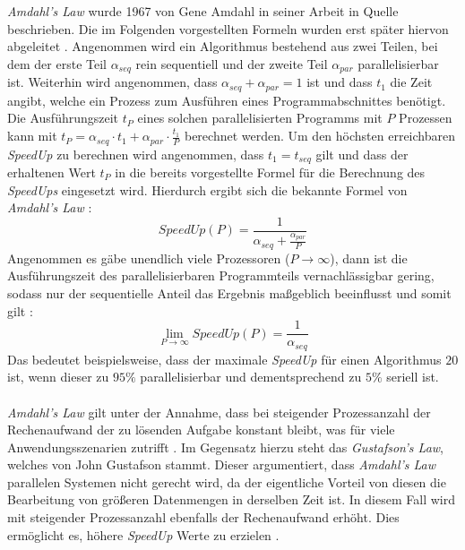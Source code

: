 \\\\
\emph{Amdahl's Law} wurde 1967 von Gene Amdahl in seiner Arbeit in Quelle \cite{amdahll1967validity} beschrieben. Die im Folgenden vorgestellten Formeln wurden erst später hiervon abgeleitet \cite{amdahll1967validity}. Angenommen wird ein Algorithmus bestehend aus zwei Teilen, bei dem der erste Teil $\alpha_{seq}$ rein sequentiell und der zweite Teil $\alpha_{par}$ parallelisierbar ist. Weiterhin wird angenommen, dass $\alpha_{seq}+\alpha_{par}=1$ ist und dass $t_1$ die Zeit angibt, welche ein Prozess zum Ausführen eines Programmabschnittes benötigt. Die Ausführungszeit $t_P$ eines solchen parallelisierten Programms mit $P$ Prozessen kann mit $t_P=\alpha_{seq} \cdot t_1 + \alpha_{par} \cdot \frac{t_1}{P}$ berechnet werden. Um den höchsten erreichbaren \emph{SpeedUp} zu berechnen wird angenommen, dass $t_1=t_{seq}$ gilt und dass der erhaltenen Wert $t_P$ in die bereits vorgestellte Formel für die Berechnung des \emph{SpeedUps} eingesetzt wird. Hierdurch ergibt sich die bekannte Formel von \emph{Amdahl's Law} \cite{nielsen2016introduction}: 
$$SpeedUp(P)=\frac{1}{\alpha_{seq}+\frac{\alpha_{par}}{P}}$$
Angenommen es gäbe unendlich viele Prozessoren ($P \rightarrow \infty$), dann ist die Ausführungszeit des parallelisierbaren Programmteils vernachlässigbar gering, sodass nur der sequentielle Anteil das Ergebnis maßgeblich beeinflusst und somit gilt \cite{nielsen2016introduction}:
$$\lim _{P \rightarrow \infty} SpeedUp(P)=\frac{1}{\alpha_{seq}}$$
Das bedeutet beispielsweise, dass der maximale \emph{SpeedUp} für einen Algorithmus $20$ ist, wenn dieser zu $95\%$ parallelisierbar und dementsprechend zu $5\%$ seriell ist. 
\\\\ %
\emph{Amdahl's Law} gilt unter der Annahme, dass bei steigender Prozessanzahl der Rechenaufwand der zu lösenden Aufgabe konstant bleibt, was für viele Anwendungsszenarien zutrifft \cite{nielsen2016introduction}. Im Gegensatz hierzu steht das \emph{Gustafson's Law}, welches von John Gustafson stammt. Dieser argumentiert, dass \emph{Amdahl's Law} parallelen Systemen nicht gerecht wird, da der eigentliche Vorteil von diesen die Bearbeitung von größeren Datenmengen in derselben Zeit ist. In diesem Fall wird mit steigender Prozessanzahl ebenfalls der Rechenaufwand erhöht. Dies ermöglicht es, höhere \emph{SpeedUp} Werte zu erzielen \cite{hill2008amdahl}.




















